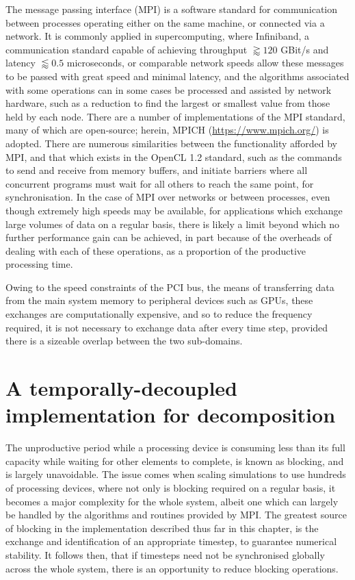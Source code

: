 The message passing interface (MPI) is a software standard for communication between processes operating either on the same machine, or connected via a network. It is commonly applied in supercomputing, where Infiniband, a communication standard capable of achieving throughput $\gtrapprox120$ GBit/s and latency $\lessapprox0.5$ microseconds, or comparable network speeds allow these messages to be passed with great speed and minimal latency, and the algorithms associated with some operations can in some cases be processed and assisted by network hardware, such as a reduction to find the largest or smallest value from those held by each node. There are a number of implementations of the MPI standard, many of which are open-source; herein, MPICH (\url{https://www.mpich.org/}) is adopted. There are numerous similarities between the functionality afforded by MPI, and that which exists in the OpenCL 1.2 standard, such as the commands to send and receive from memory buffers, and initiate barriers where all concurrent programs must wait for all others to reach the same point, for synchronisation. In the case of MPI over networks or between processes, even though extremely high speeds may be available, for applications which exchange large volumes of data on a regular basis, there is likely a limit beyond which no further performance gain can be achieved, in part because of the overheads of dealing with each of these operations, as a proportion of the productive processing time.

Owing to the speed constraints of the PCI bus, the means of transferring data from the main system memory to peripheral devices such as GPUs, these exchanges are computationally expensive, and so to reduce the frequency required, it is not necessary to exchange data after every time step, provided there is a sizeable overlap between the two sub-domains. 

\section{A temporally-decoupled implementation for decomposition}

The unproductive period while a processing device is consuming less than its full capacity while waiting for other elements to complete, is known as blocking, and is largely unavoidable. The issue comes when scaling simulations to use hundreds of processing devices, where not only is blocking required on a regular basis, it becomes a major complexity for the whole system, albeit one which can largely be handled by the algorithms and routines provided by MPI. The greatest source of blocking in the implementation described thus far in this chapter, is the exchange and identification of an appropriate timestep, to guarantee numerical stability. It follows then, that if timesteps need not be synchronised globally across the whole system, there is an opportunity to reduce blocking operations. 

